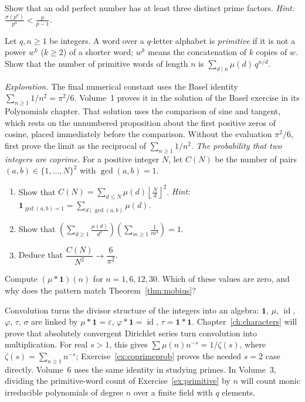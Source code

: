\begin{exercise}[$\star\star$]\label{ex:oddperfect}
Show that an odd perfect number has at least three distinct prime factors. \emph{Hint: $\frac{\sigma(p^a)}{p^a}<\frac p{p-1}$.}
\end{exercise}

\begin{exercise}[$\star\star$]\label{ex:primitive}
Let $q,n\ge1$ be integers. A word over a $q$-letter alphabet is \emph{primitive} if it is not a power $w^k$ ($k\ge2$) of a shorter word; $w^k$ means the concatenation of $k$ copies of $w$. Show that the number of primitive words of length $n$ is $\sum_{d\mid n}\mu(d)\,q^{n/d}$.
\end{exercise}

\begin{exercise}[$\star\star\star$]\label{ex:coprimeprob}
\emph{Exploration.} The final numerical constant uses the Basel identity
$\sum_{n\ge1}1/n^2=\pi^2/6$. Volume~1 proves it in the solution of the Basel exercise in its Polynomials chapter. That solution uses the comparison of sine and tangent, which rests on the unnumbered proposition about the first positive zeros of cosine, placed immediately before the comparison. Without the evaluation $\pi^2/6$, first prove
the limit as the reciprocal of $\sum_{n\ge1}1/n^2$.
\emph{The probability that two integers are coprime.} For a positive integer $N$, let $C(N)$ be the number of pairs $(a,b)\in\{1,\dots,N\}^2$ with $\gcd(a,b)=1$.
\begin{enumerate}[label=(\alph*)]
\item Show that $C(N)=\sum_{d\le N}\mu(d)\left\lfloor\frac Nd\right\rfloor^2$. \emph{Hint: $\mathbf 1_{\gcd(a,b)=1}=\sum_{d\mid\gcd(a,b)}\mu(d)$.}
\item Show that $\left(\sum_{d\ge1}\frac{\mu(d)}{d^2}\right)\left(\sum_{m\ge1}\frac1{m^2}\right)=1$.
\item Deduce that $\dfrac{C(N)}{N^2}\to\dfrac6{\pi^2}$.
\end{enumerate}
\end{exercise}

\begin{exercise}[$\star$]\label{ex:t1-mu12}
Compute $(\mu*\mathbf 1)(n)$ for $n=1,6,12,30$. Which of these values are zero, and why does the pattern match Theorem~\ref{thm:mobius}?
\end{exercise}

\begin{beauty}
Convolution turns the divisor structure of the integers into an algebra: $\mathbf 1$, $\mu$, $\operatorname{id}$, $\varphi$, $\tau$, $\sigma$ are linked by $\mu*\mathbf 1=\varepsilon$, $\varphi*\mathbf 1=\operatorname{id}$, $\tau=\mathbf 1*\mathbf 1$. Chapter~\ref{ch:characters} will prove that absolutely convergent Dirichlet series turn convolution into multiplication. For real $s>1$, this gives $\sum\mu(n)n^{-s}=1/\zeta(s)$, where $\zeta(s)=\sum_{n\ge1}n^{-s}$; Exercise~\ref{ex:coprimeprob} proves the needed $s=2$ case directly. Volume~6 uses the same identity in studying primes. In Volume~3, dividing the primitive-word count of Exercise~\ref{ex:primitive} by $n$ will count monic irreducible polynomials of degree $n$ over a finite field with $q$ elements.
\end{beauty}

